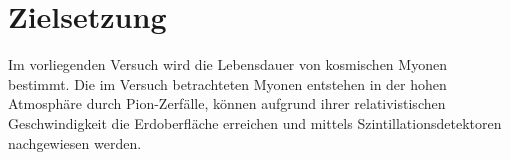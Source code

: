 \section{Zielsetzung}
\label{sec:Zielsetzung}
Im vorliegenden Versuch wird die Lebensdauer von kosmischen Myonen bestimmt. Die im Versuch betrachteten Myonen entstehen in der hohen Atmosphäre durch Pion-Zerfälle, können aufgrund ihrer relativistischen Geschwindigkeit die Erdoberfläche erreichen und mittels Szintillationsdetektoren nachgewiesen werden.
